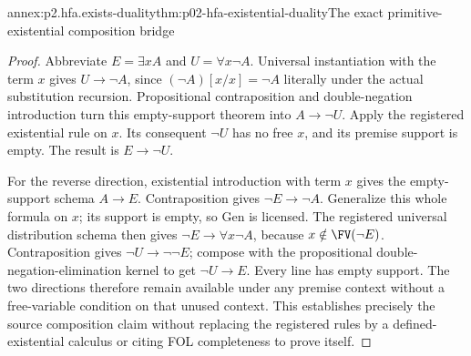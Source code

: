 \begin{annexitem}{annex:p2.hfa.exists-duality}{thm:p02-hfa-existential-duality}{The exact primitive-existential composition bridge}
\begin{proof}
Abbreviate \(E=\exists xA\) and \(U=\forall x\neg A\).
Universal instantiation with the term \(x\) gives
\(U\to\neg A\), since \((\neg A)[x/x]=\neg A\) literally
under the actual substitution recursion. Propositional contraposition
and double-negation introduction turn this empty-support theorem into
\(A\to\neg U\). Apply the registered existential rule on \(x\).
Its consequent \(\neg U\) has no free \(x\), and its premise
support is empty. The result is \(E\to\neg U\).

For the reverse direction, existential introduction with term \(x\)
gives the empty-support schema \(A\to E\). Contraposition gives
\(\neg E\to\neg A\). Generalize this whole formula on \(x\);
its support is empty, so Gen is licensed. The registered universal
distribution schema then gives \(\neg E\to\forall x\neg A\),
because \(x\notin\FV(\neg E)\). Contraposition gives
\(\neg U\to\neg\neg E\); compose with the propositional
double-negation-elimination kernel to get \(\neg U\to E\).
Every line has empty support. The two directions therefore remain
available under any premise context without a free-variable condition
on that unused context. This establishes precisely the source
composition claim without replacing the registered rules by a
defined-existential calculus or citing FOL completeness to prove itself.
\end{proof}
\end{annexitem}

